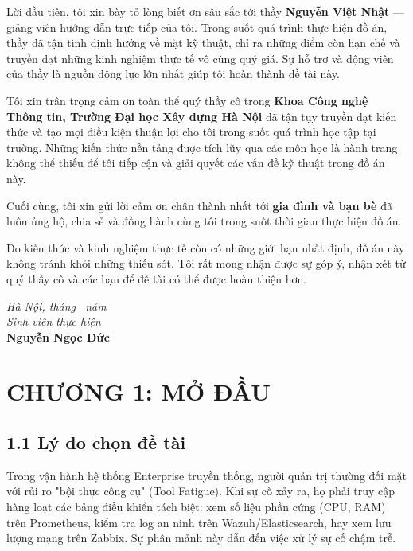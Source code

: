 \documentclass[13pt,a4paper]{extarticle}
\begin{document}
Lời đầu tiên, tôi xin bày tỏ lòng biết ơn sâu sắc tới thầy \textbf{Nguyễn Việt Nhật} --- giảng viên hướng dẫn trực tiếp của tôi. Trong suốt quá trình thực hiện đồ án, thầy đã tận tình định hướng về mặt kỹ thuật, chỉ ra những điểm còn hạn chế và truyền đạt những kinh nghiệm thực tế vô cùng quý giá. Sự hỗ trợ và động viên của thầy là nguồn động lực lớn nhất giúp tôi hoàn thành đề tài này.

Tôi xin trân trọng cảm ơn toàn thể quý thầy cô trong \textbf{Khoa Công nghệ Thông tin, Trường Đại học Xây dựng Hà Nội} đã tận tụy truyền đạt kiến thức và tạo mọi điều kiện thuận lợi cho tôi trong suốt quá trình học tập tại trường. Những kiến thức nền tảng được tích lũy qua các môn học là hành trang không thể thiếu để tôi tiếp cận và giải quyết các vấn đề kỹ thuật trong đồ án này.

Cuối cùng, tôi xin gửi lời cảm ơn chân thành nhất tới \textbf{gia đình và bạn bè} đã luôn ủng hộ, chia sẻ và đồng hành cùng tôi trong suốt thời gian thực hiện đồ án.

Do kiến thức và kinh nghiệm thực tế còn có những giới hạn nhất định, đồ án này không tránh khỏi những thiếu sót. Tôi rất mong nhận được sự góp ý, nhận xét từ quý thầy cô và các bạn để đề tài có thể được hoàn thiện hơn.

\vspace{1em}
\begin{flushright}
\textit{Hà Nội, tháng \the\month\ năm \the\year}\\[6pt]
\textit{Sinh viên thực hiện}\\[24pt]
\textbf{Nguyễn Ngọc Đức}
\end{flushright}

\tableofcontents
{}
\newpage

\listoffigures
{}
\newpage

\section{CHƯƠNG 1: MỞ ĐẦU}

\subsection{1.1 Lý do chọn đề tài}
Trong vận hành hệ thống Enterprise truyền thống, người quản trị thường đối mặt với rủi ro "bội thực công cụ" (Tool Fatigue). Khi sự cố xảy ra, họ phải truy cập hàng loạt các bảng điều khiển tách biệt: xem số liệu phần cứng (CPU, RAM) trên Prometheus, kiểm tra log an ninh trên Wazuh/Elasticsearch, hay xem lưu lượng mạng trên Zabbix. Sự phân mảnh này dẫn đến việc xử lý sự cố chậm trễ.
\end{document}
